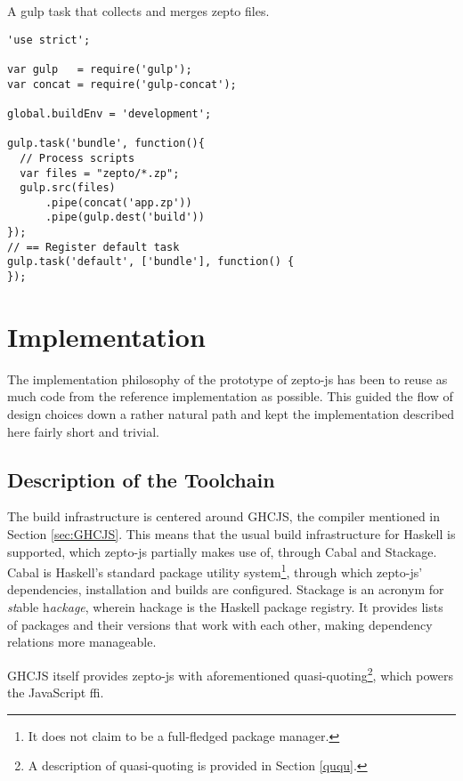 \documentclass[oneside,11pt,xetex]{scrbook}
\begin{document}
\begin{listing}[H]
\caption{A gulp task that collects and merges zepto files.}
\begin{verbatim}
'use strict';

var gulp   = require('gulp');
var concat = require('gulp-concat');

global.buildEnv = 'development';

gulp.task('bundle', function(){
  // Process scripts
  var files = "zepto/*.zp";
  gulp.src(files)
      .pipe(concat('app.zp'))
      .pipe(gulp.dest('build'))
});
// == Register default task
gulp.task('default', ['bundle'], function() {
});
\end{verbatim}
\label{fig:gulp}
\end{listing}

\chapter{Implementation}
\label{chap:Implementation}

The implementation philosophy of the prototype of zepto-js has been to reuse as much
code from the reference implementation as possible. This guided the flow of design choices
down a rather natural path and kept the implementation described here fairly short and trivial.

\section{Description of the Toolchain}

The build infrastructure is centered around GHCJS, the compiler mentioned in Section \ref{sec:GHCJS}.
This means that the usual build infrastructure for Haskell is supported, which zepto-js partially
makes use of, through Cabal and Stackage. Cabal is Haskell's standard package utility
system\footnote{It does not claim to be a full-fledged package manager.}, through which
zepto-js' dependencies, installation and builds are configured. Stackage is an acronym
for \textit{st}able h\textit{ackage}, wherein hackage is the Haskell package registry.
It provides lists of packages and their versions that work with each other, making
dependency relations more manageable.

GHCJS itself provides zepto-js with aforementioned quasi-quoting\footnote{A description
of quasi-quoting is provided in Section \ref{ququ}.}, which powers the JavaScript \gls{ffi}.
\end{document}
